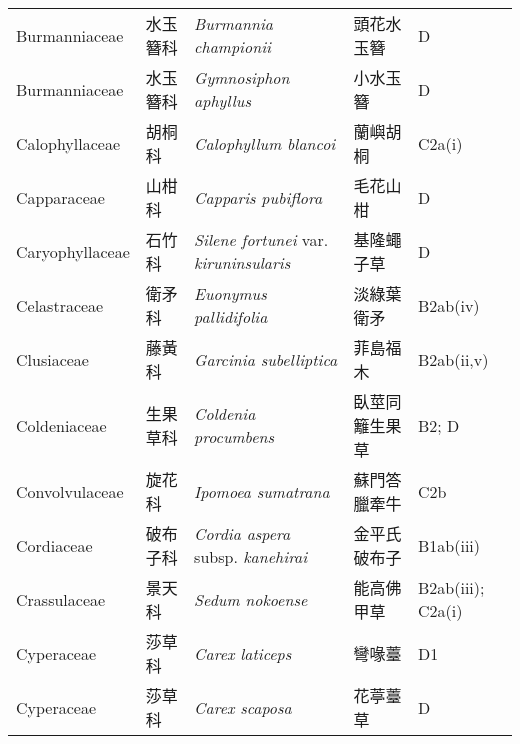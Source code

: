 {\begin{longtable}{p{2.5cm}p{2.5cm}p{4.5cm}p{2.5cm}p{3cm}}
    Burmanniaceae & 水玉簪科 & \textit{Burmannia championii}  & 頭花水玉簪 & D \index{Burmannia@\textit{Burmannia}!championii@\textit{championii}}  \index{頭花水玉簪} \\
    Burmanniaceae & 水玉簪科 & \textit{Gymnosiphon aphyllus}  & 小水玉簪 & D \index{Gymnosiphon@\textit{Gymnosiphon}!aphyllus@\textit{aphyllus}}  \index{小水玉簪} \\
    Calophyllaceae & 胡桐科 & \textit{Calophyllum blancoi}  & 蘭嶼胡桐 & C2a(i) \index{Calophyllum@\textit{Calophyllum}!blancoi@\textit{blancoi}}  \index{蘭嶼胡桐} \\
    Capparaceae & 山柑科 & \textit{Capparis pubiflora}  & 毛花山柑 & D \index{Capparis@\textit{Capparis}!pubiflora@\textit{pubiflora}}  \index{毛花山柑} \\
    Caryophyllaceae & 石竹科 & \textit{Silene fortunei} var. \textit{kiruninsularis}  & 基隆蠅子草 & D \index{Silene@\textit{Silene}!fortunei@\textit{fortunei}!var. kiruninsularis@var. \textit{kiruninsularis}}  \index{基隆蠅子草} \\
    Celastraceae & 衛矛科 & \textit{Euonymus pallidifolia}  & 淡綠葉衛矛 & B2ab(iv) \index{Euonymus@\textit{Euonymus}!pallidifolia@\textit{pallidifolia}}  \index{淡綠葉衛矛} \\
    Clusiaceae & 藤黃科 & \textit{Garcinia subelliptica}  & 菲島福木 & B2ab(ii,v) \index{Garcinia@\textit{Garcinia}!subelliptica@\textit{subelliptica}}  \index{菲島福木} \\
    Coldeniaceae & 生果草科 & \textit{Coldenia procumbens}  & 臥莖同籬生果草 & B2; D \index{Coldenia@\textit{Coldenia}!procumbens@\textit{procumbens}}  \index{臥莖同籬生果草} \\
    Convolvulaceae & 旋花科 & \textit{Ipomoea sumatrana}  & 蘇門答臘牽牛 & C2b \index{Ipomoea@\textit{Ipomoea}!sumatrana@\textit{sumatrana}}  \index{蘇門答臘牽牛} \\
    Cordiaceae & 破布子科 & \textit{Cordia aspera} subsp. \textit{kanehirai}  & 金平氏破布子 & B1ab(iii) \index{Cordia@\textit{Cordia}!aspera@\textit{aspera}!subsp. kanehirai@subsp. \textit{kanehirai}}  \index{金平氏破布子} \\
    Crassulaceae & 景天科 & \textit{Sedum nokoense}  & 能高佛甲草 & B2ab(iii); C2a(i) \index{Sedum@\textit{Sedum}!nokoense@\textit{nokoense}}  \index{能高佛甲草} \\
    Cyperaceae & 莎草科 & \textit{Carex laticeps}  & 彎喙薹 & D1 \index{Carex@\textit{Carex}!laticeps@\textit{laticeps}}  \index{彎喙薹} \\
    Cyperaceae & 莎草科 & \textit{Carex scaposa}  & 花葶薹草 & D \index{Carex@\textit{Carex}!scaposa@\textit{scaposa}}  \index{花葶薹草} \\

\end{longtable}}
